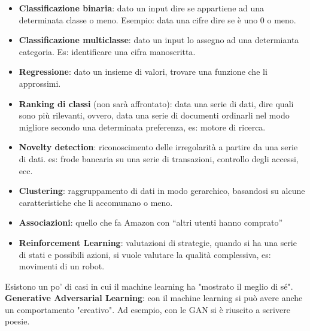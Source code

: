\begin{itemize}
\item
  \textbf{Classificazione binaria}: dato un input dire se appartiene ad
  una determinata classe o meno. Esempio: data una cifre dire se è uno 0
  o meno.
\item
  \textbf{Classificazione multiclasse}: dato un input lo assegno ad una
  determianta categoria. Es: identificare una cifra manoscritta.
\item
  \textbf{Regressione}: dato un insieme di valori, trovare una funzione
  che li approssimi.
\item
  \textbf{Ranking di classi} (non sarà affrontato): data una serie di
  dati, dire quali sono più rilevanti, ovvero, data una serie di
  documenti ordinarli nel modo migliore secondo una determinata
  preferenza, es: motore di ricerca.
\item
  \textbf{Novelty detection}: riconoscimento delle irregolarità a
  partire da una serie di dati. es: frode bancaria su una serie di
  transazioni, controllo degli accessi, ecc.
\item
  \textbf{Clustering}: raggruppamento di dati in modo gerarchico,
  basandosi su alcune caratteristiche che li accomunano o meno.
\item
  \textbf{Associazioni}: quello che fa Amazon con ``altri utenti hanno
  comprato''
\item
  \textbf{Reinforcement Learning}: valutazioni di strategie, quando si
  ha una serie di stati e possibili azioni, si vuole valutare la qualità
  complessiva, es: movimenti di un robot.
\end{itemize}

Esistono un po' di casi in cui il machine learning ha "mostrato il meglio di sé".
\textbf{Generative Adversarial Learning}: con il machine learning si può avere anche un comportamento "creativo". 
Ad esempio, con le GAN si è riuscito a scrivere poesie.